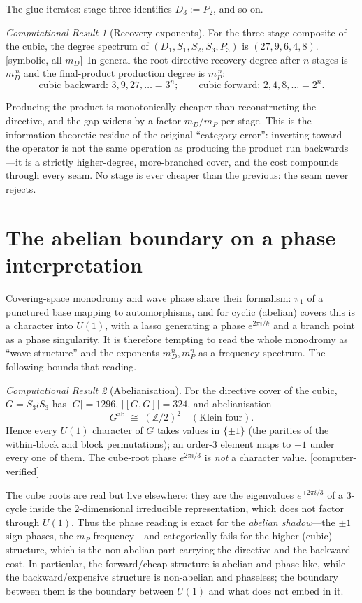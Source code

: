 \documentclass[11pt]{article}
\theoremstyle{plain}
\theoremstyle{definition}
\theoremstyle{remark}
\newtheorem{result}{Computational Result}
\newcommand{\Symbolic}{\textsf{[symbolic, all $m_D$]}}
\newcommand{\Measured}{\textsf{[computer-verified]}}
\newcommand{\Z}{\mathbb{Z}}
\begin{document}
The glue iterates: stage three identifies $D_3:=P_2$, and so on.

\begin{result}[Recovery exponents]
\label{res:iterate}
For the three-stage composite of the cubic, the degree spectrum of
$(D_1,S_1,S_2,S_3,P_3)$ is $(27,9,6,4,8)$. \Symbolic\ In general the root-directive
recovery degree after $n$ stages is $m_D^{\,n}$ and the final-product production
degree is $m_P^{\,n}$:
\[
  \text{cubic backward: } 3,9,27,\dots=3^n;\qquad
  \text{cubic forward: } 2,4,8,\dots=2^n.
\]
\end{result}

\noindent Producing the product is monotonically cheaper than reconstructing the
directive, and the gap widens by a factor $m_D/m_P$ per stage. This is the
information-theoretic residue of the original ``category error'': inverting toward
the operator is not the same operation as producing the product run backwards---it
is a strictly higher-degree, more-branched cover, and the cost compounds through
every seam. No stage is ever cheaper than the previous: the seam never rejects.

\section{The abelian boundary on a phase interpretation}
\label{sec:abelian}

Covering-space monodromy and wave phase share their formalism: $\pi_1$ of a
punctured base mapping to automorphisms, and for cyclic (abelian) covers this is a
character into $U(1)$, with a lasso generating a phase $e^{2\pi i/k}$ and a branch
point as a phase singularity. It is therefore tempting to read the whole monodromy
as ``wave structure'' and the exponents $m_D^n, m_P^n$ as a frequency spectrum.
The following bounds that reading.

\begin{result}[Abelianisation]
\label{res:abelian}
For the directive cover of the cubic, $G=S_3\wr S_3$ has $|G|=1296$,
$|[G,G]|=324$, and abelianisation
\[
  G^{\mathrm{ab}} \;\cong\; (\Z/2)^2 \quad(\text{Klein four}).
\]
Hence every $U(1)$ character of $G$ takes values in $\{\pm 1\}$ (the parities of
the within-block and block permutations); an order-$3$ element maps to $+1$ under
every one of them. The cube-root phase $e^{2\pi i/3}$ is \emph{not} a character
value. \Measured
\end{result}

\noindent The cube roots are real but live elsewhere: they are the eigenvalues
$e^{\pm 2\pi i/3}$ of a $3$-cycle inside the $2$-dimensional irreducible
representation, which does not factor through $U(1)$. Thus the phase reading is
exact for the \emph{abelian shadow}---the $\pm1$ sign-phases, the
$m_P$-frequency---and categorically fails for the higher (cubic) structure, which
is the non-abelian part carrying the directive and the backward cost. In
particular, the forward/cheap structure is abelian and phase-like, while the
backward/expensive structure is non-abelian and phaseless; the boundary between
them is the boundary between $U(1)$ and what does not embed in it.
\end{document}
